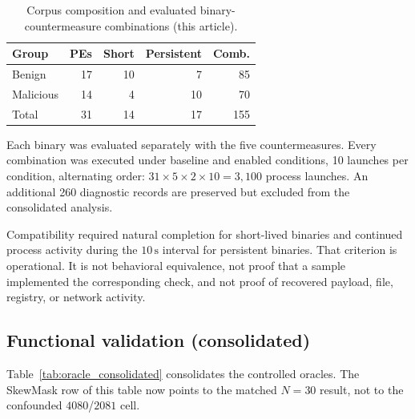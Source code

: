 \documentclass[pdflatex,sn-mathphys-num]{sn-jnl}
\theoremstyle{thmstyleone}
\theoremstyle{thmstyletwo}
\theoremstyle{thmstylethree}
\begin{document}
\begin{table}[t]
\caption{Corpus composition and evaluated binary-countermeasure combinations (this article).}
\label{tab:corpus}
\centering
\small
\begin{tabular}{lrrrr}
\toprule
\textbf{Group} & \textbf{PEs} & \textbf{Short} & \textbf{Persistent} & \textbf{Comb.} \\
\midrule
Benign & 17 & 10 & 7 & 85 \\
Malicious & 14 & 4 & 10 & 70 \\
Total & 31 & 14 & 17 & 155 \\
\bottomrule
\end{tabular}
\end{table}

Each binary was evaluated separately with the five countermeasures. Every combination was executed under baseline and enabled conditions, 10 launches per condition, alternating order: $31\times 5\times 2\times 10 = 3{,}100$ process launches. An additional 260 diagnostic records are preserved but excluded from the consolidated analysis.

Compatibility required natural completion for short-lived binaries and continued process activity during the $10\,\mathrm{s}$ interval for persistent binaries. That criterion is operational. It is not behavioral equivalence, not proof that a sample implemented the corresponding check, and not proof of recovered payload, file, registry, or network activity.

\subsection{Functional validation (consolidated)}
\label{subsec:functional_consolidated}

Table~\ref{tab:oracle_consolidated} consolidates the controlled oracles. The SkewMask row of this table now points to the matched $N=30$ result, not to the confounded $4080$/$2081$ cell.
\end{document}
